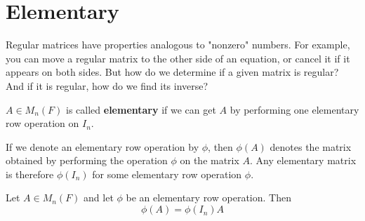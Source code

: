\section{Elementary}
\begin{note}
    Regular matrices have properties analogous to "nonzero" numbers. For example, you can move a regular matrix to the other side of an equation, or cancel it if it appears on both sides. But how do we determine if a given matrix is regular? And if it is regular, how do we find its inverse?
\end{note}

\begin{definition}\label{def:elementary-matrix}
    $A \in M_n(F)$ is called \textbf{elementary} if we can get $A$ by performing one elementary row operation on $I_n$.
\end{definition}

\begin{notation}
    If we denote an elementary row operation by $\phi$, then $\phi(A)$ denotes the matrix obtained by performing the operation $\phi$ on the matrix $A$. Any elementary matrix is therefore $\phi(I_n)$ for some elementary row operation $\phi$.
\end{notation}

\begin{proposition}\label{prop:elementary-mult}
    Let $A \in M_n(F)$ and let $\phi$ be an elementary row operation. Then
    \[
    \phi(A) = \phi(I_n) A
    \]
\end{proposition}

